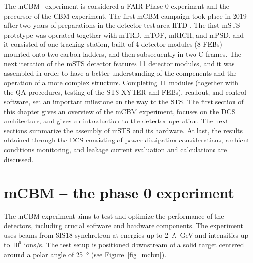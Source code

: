 The mCBM~\cite{mCBM} experiment is considered a \gls{FAIR} Phase \num{0} experiment and the precursor of the \gls{CBM} experiment. The first \gls{mCBM} campaign took place in \num{2019} after two years of preparations in the detector test area HTD \cite{progress_report_2017_sturm}. The first \gls{mSTS} prototype was operated together with mTRD, mTOF, mRICH, and mPSD, and it consisted of one tracking station, built of \num{4} detector modules (\num{8} \glspl{FEB}) mounted onto two carbon ladders, and then subsequently in two C-frames. The next iteration of the \gls{mSTS} detector features \num{11} detector modules, and it was assembled in order to have a better understanding of the components and the operation of a more complex structure. Completing \num{11} modules (together with the QA procedures, testing of the STS-XYTER and \glspl{FEB}), readout, and control software, set an important milestone on the way to the \gls{STS}. The first section of this chapter gives an overview of the \gls{mCBM} experiment, focuses on the \gls{DCS} architecture, and gives an introduction to the detector operation. The next sections summarize the assembly of \gls{mSTS} and its hardware. At last, the results obtained through the \gls{DCS} consisting of power dissipation considerations, ambient conditions monitoring, and leakage current evaluation and calculations are discussed.

\section{mCBM -- the phase 0 experiment}
The \gls{mCBM} experiment aims to test and optimize the performance of the detectors, including crucial software and hardware components. The experiment uses beams from SIS18 synchrotron at energies up to \SI{2}{\A\giga\eV} and intensities up to $10^{9}$ ions/s. The test setup is positioned downstream of a solid target centered around a polar angle of \SI{25}{\degree} (see Figure~\ref{fig_mcbm}).

